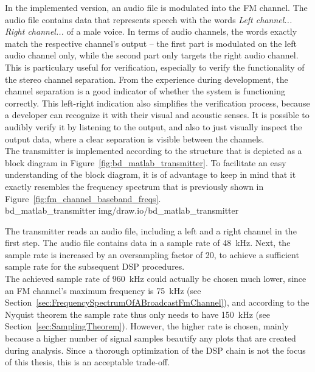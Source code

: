 In the implemented version, an audio file is modulated into the FM channel.
The audio file contains data that represents speech with the words \textit{Left channel... Right channel...} of a male voice.
In terms of audio channels, the words exactly match the respective channel's output -- the first part is modulated on the left audio channel only, while the second part only targets the right audio channel.
This is particulary useful for verification, especially to verify the functionality of the stereo channel separation.
From the experience during development, the channel separation is a good indicator of whether the system is functioning correctly.
This left-right indication also simplifies the verification process, because a developer can recognize it with their visual and acoustic senses.
It is possible to audibly verify it by listening to the output, and also to just visually inspect the output data, where a clear separation is visible between the channels.\\

The transmitter is implemented according to the structure that is depicted as a block diagram in Figure~\ref{fig:bd_matlab_transmitter}.
To facilitate an easy understanding of the block diagram, it is of advantage to keep in mind that it exactly resembles the frequency spectrum that is previously shown in Figure~\ref{fig:fm_channel_baseband_freqs}.\\

 {bd_matlab_transmitter} {img/draw.io/bd_matlab_transmitter}

The transmitter reads an audio file, including a left and a right channel in the first step.
The audio file contains data in a sample rate of 48~kHz.
Next, the sample rate is increased by an oversampling factor of 20, to achieve a sufficient sample rate for the subsequent DSP procedures.\\

The achieved sample rate of 960~kHz could actually be chosen much lower, since an FM channel's maximum frequency is 75~kHz (see Section~\ref{sec:FrequencySpectrumOfABroadcastFmChannel}), and according to the Nyquist theorem the sample rate thus only needs to have 150~kHz (see Section~\ref{sec:SamplingTheorem}).
However, the higher rate is chosen, mainly because a higher number of signal samples beautify any plots that are created during analysis.
Since a thorough optimization of the DSP chain is not the focus of this thesis, this is an acceptable trade-off.\\

